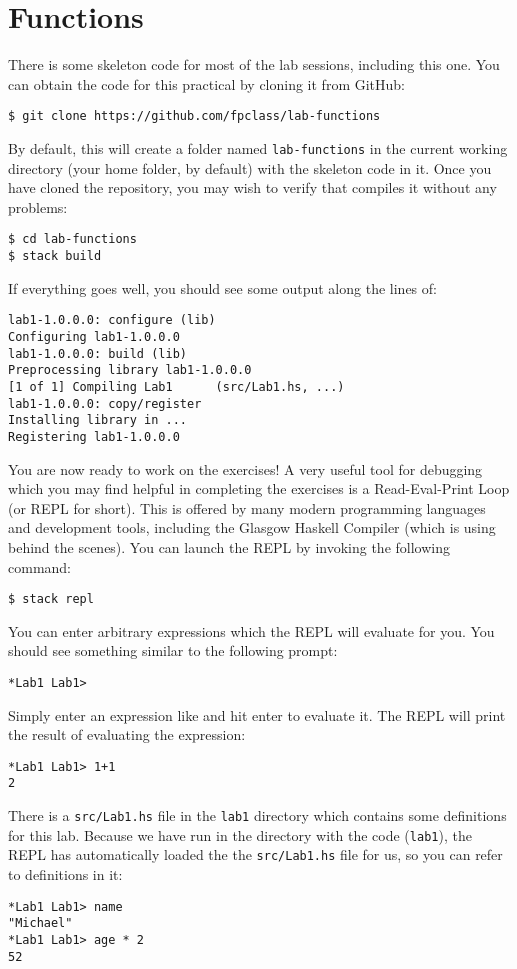 \section{Functions}

There is some skeleton code for most of the lab sessions, including this one. You can obtain the code for this practical by cloning it from GitHub:
\begin{verbatim}
$ git clone https://github.com/fpclass/lab-functions
\end{verbatim}
By default, this will create a folder named \texttt{\small lab-functions} in the current working directory (your home folder, by default) with the skeleton code in it. Once you have cloned the repository, you may wish to verify that  compiles it without any problems:
\begin{verbatim}
$ cd lab-functions
$ stack build
\end{verbatim}
If everything goes well, you should see some output along the lines of:
\begin{verbatim}
lab1-1.0.0.0: configure (lib)
Configuring lab1-1.0.0.0
lab1-1.0.0.0: build (lib)
Preprocessing library lab1-1.0.0.0
[1 of 1] Compiling Lab1      (src/Lab1.hs, ...)
lab1-1.0.0.0: copy/register
Installing library in ...
Registering lab1-1.0.0.0
\end{verbatim}
You are now ready to work on the exercises! A very useful tool for debugging which you may find helpful in completing the exercises is a Read-Eval-Print Loop (or REPL for short). This is offered by many modern programming languages and development tools, including the Glasgow Haskell Compiler (which  is using behind the scenes). You can launch the REPL by invoking the following command:
\begin{verbatim}
$ stack repl
\end{verbatim}
You can enter arbitrary expressions which the REPL will evaluate for you. You should see something similar to the following prompt:
\begin{verbatim}
*Lab1 Lab1>
\end{verbatim}
Simply enter an expression like  and hit enter to evaluate it. The REPL will print the result of evaluating the expression:
\begin{verbatim}
*Lab1 Lab1> 1+1
2
\end{verbatim}
There is a \texttt{\small src/Lab1.hs} file in the \texttt{\small lab1} directory which contains some definitions for this lab. Because we have run  in the directory with the code (\texttt{\small lab1}), the REPL has automatically loaded the the \texttt{\small src/Lab1.hs} file for us, so you can refer to definitions in it:
\begin{verbatim}
*Lab1 Lab1> name
"Michael"
*Lab1 Lab1> age * 2
52
\end{verbatim}

